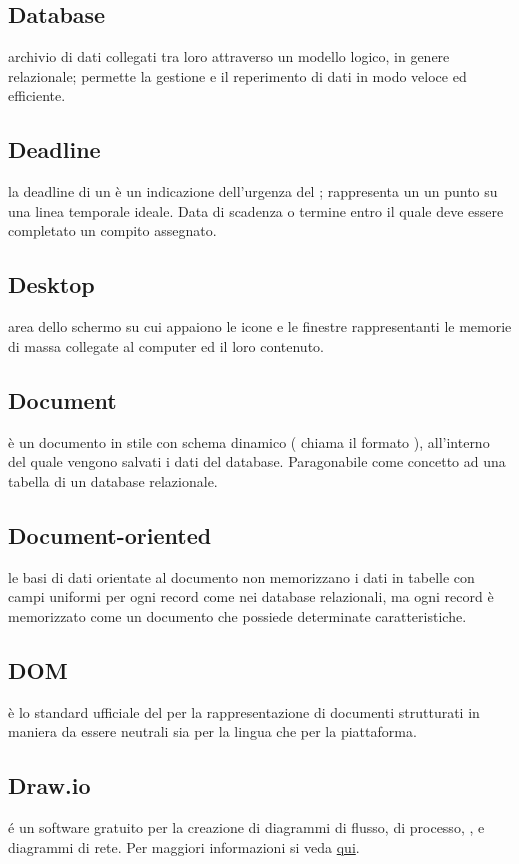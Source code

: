 \documentclass[12pt,a4paper]{article}
\begin{document}
\subsection{Database} 
 archivio di dati collegati tra loro attraverso un modello logico, in genere relazionale; permette la gestione e il reperimento di dati in modo veloce ed efficiente.

\subsection{Deadline} 
 la deadline di un  è un indicazione dell'urgenza del ; rappresenta un un punto su una linea temporale ideale. Data di scadenza o termine entro il quale deve essere completato un compito assegnato.

\subsection{Desktop} 
 area dello schermo su cui appaiono le icone e le finestre rappresentanti le memorie di massa collegate al computer ed il loro contenuto.

\subsection{Document} 
è un documento in stile  con schema dinamico ( chiama il formato ), all'interno del quale vengono salvati i dati del database. Paragonabile come concetto ad una tabella di un database relazionale.

\subsection{Document-oriented} 
 le basi di dati orientate al documento non memorizzano i dati in tabelle con campi uniformi per ogni record come nei database relazionali, ma ogni record è memorizzato come un documento che possiede determinate caratteristiche.

\subsection{DOM} 
 è lo standard ufficiale del  per la rappresentazione di documenti strutturati in maniera da essere neutrali sia per la lingua che per la piattaforma.

\subsection{Draw.io} 
 é un software gratuito per la creazione di diagrammi di flusso, di processo, , e diagrammi di rete. Per maggiori informazioni si veda \href{https://www.draw.io}{qui}.
\end{document}
